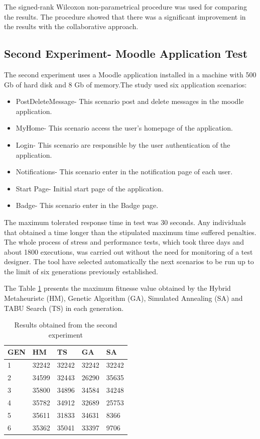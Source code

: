 The signed-rank Wilcoxon non-parametrical procedure was used for comparing the results. The procedure showed that there was a significant improvement in the results with the collaborative approach.

\subsection{Second Experiment- Moodle Application Test}

The second experiment uses a Moodle application installed in a machine with 500 Gb of hard disk and 8 Gb of memory.The study used six application scenarios:

\begin{itemize}
\item PostDeleteMessage- This scenario post and delete messages in the moodle application.
\item MyHome- This scenario access the user's homepage of the application.
\item Login- This scenario are responsible by the user authentication of the application.
\item Notifications- This scenario enter in the notification page of each user.
\item Start Page- Initial start page of the application.
\item Badge- This scenario enter in the Badge page.
\end{itemize}

The maximum tolerated response time in test was 30 seconds.  Any  individuals that obtained a time longer than the stipulated maximum time suffered penalties.  The whole process of stress and performance tests, which took three days and about 1800 executions, was carried out without the need for monitoring of a test designer. The tool have  selected automatically the next scenarios to be run up to the limit of six generations previously established. 

The Table \ref{tab:secondexperiment} presents the maximum fitnesse value obtained by the Hybrid Metaheuristc (HM), Genetic Algorithm (GA), Simulated Annealing (SA) and TABU Search (TS) in each generation. 

\begin{table}[h]
\centering
\caption{Results obtained from the second experiment}
\label{tab:secondexperiment}
\begin{tabular}{|l|l|l|l|l|}
\hline
GEN & HM    & TS    & GA    & SA    \\
\hline
1          & 32242 & 32242 & 32242 & 32242 \\
\hline
2          & 34599 & 32443 & 26290 & 35635 \\
\hline
3          & 35800 & 34896 & 34584 & 34248 \\
\hline
4          & 35782 & 34912 & 32689 & 25753 \\
\hline
5          & 35611 & 31833 & 34631 & 8366  \\
\hline
6          & 35362 & 35041 & 33397 & 9706 \\
\hline
\end{tabular}
\end{table}


